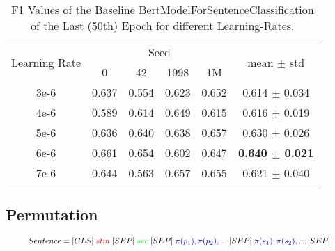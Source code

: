 \begin{table}[h]
    \centering
    \caption{F1 Values of the Baseline BertModelForSentenceClassification of the Last (50th) Epoch
             for different Learning-Rates.}
    \label{tab:my-lr}
    \begin{tabular}{|c||cccc|c|}
    \hline
    \multicolumn{1}{|l||}{\multirow{2}{*}{Learning Rate}} & \multicolumn{4}{c|}{Seed}                                                                    & \multicolumn{1}{c|}{\multirow{2}{*}{mean $\pm$ std}} \\ \cline{2-5}
    \multicolumn{1}{|l||}{}                               & \multicolumn{1}{c|}{0}     & \multicolumn{1}{c|}{42}    & \multicolumn{1}{c|}{1998}  & 1M    & \multicolumn{1}{c|}{}                                \\ \hline\hline
    3e-6                                                 & \multicolumn{1}{c|}{0.637} & \multicolumn{1}{c|}{0.554} & \multicolumn{1}{c|}{0.623} & 0.652 & 0.614 $\pm$ 0.034                           \\ \hline
    4e-6                                                 & \multicolumn{1}{c|}{0.589} & \multicolumn{1}{c|}{0.614} & \multicolumn{1}{c|}{0.649} & 0.615 & 0.616 $\pm$ 0.019                                    \\ \hline
    5e-6                                                 & \multicolumn{1}{c|}{0.636} & \multicolumn{1}{c|}{0.640} & \multicolumn{1}{c|}{0.638} & 0.657 & 0.630 $\pm$ 0.026                                    \\ \hline
    6e-6                                                 & \multicolumn{1}{c|}{0.661} & \multicolumn{1}{c|}{0.654} & \multicolumn{1}{c|}{0.602} & 0.647 & \textbf{0.640 $\pm$ 0.021}                                    \\ \hline
    7e-6                                                 & \multicolumn{1}{c|}{0.644} & \multicolumn{1}{c|}{0.563} & \multicolumn{1}{c|}{0.657} & 0.655 & 0.621 $\pm$ 0.040                                    \\ \hline
    \end{tabular}
\end{table}
\vspace{-0.5cm}











\subsection{Permutation}
\begin{equation}\label{eq:permutate}
    \resizebox{0.91\hsize}{!}{%
     $Sentence = [CLS] \; \textcolor{red}{stm}\;
                 [SEP] \; \textcolor{green}{sec}\;
                 [SEP] \; \textcolor{blue}{\pi(p_1), \pi(p_2), ... }\;
                 [SEP] \; \textcolor{blue}{\pi(s_1), \pi(s_2), ... }\;
                 [SEP]$      
    }
\end{equation}

